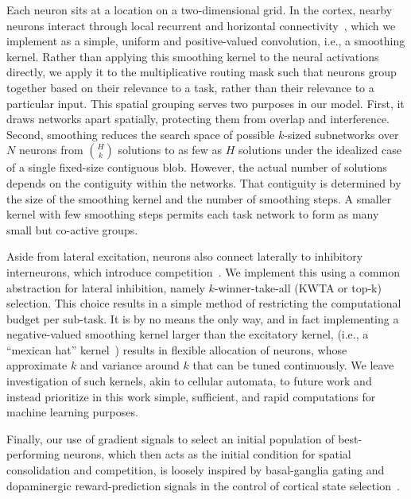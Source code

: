 \documentclass{article}
\begin{document}
Each neuron sits at a location on a two-dimensional grid. In the cortex, nearby neurons interact through local recurrent and horizontal connectivity~\citep{hubel1962receptive,gilbert1983clustered,douglas2004neuronal}, which we implement as a simple, uniform and positive-valued convolution, i.e., a smoothing kernel. Rather than applying this smoothing kernel to the neural activations directly, we apply it to the multiplicative routing mask such that neurons group together based on their relevance to a task, rather than their relevance to a particular input. This spatial grouping serves two purposes in our model. First, it draws networks apart spatially, protecting them from overlap and interference. Second, smoothing reduces the search space of possible $k$-sized subnetworks over $N$ neurons from $\binom{H}{k}$ solutions to as few as $H$ solutions under the idealized case of a single fixed-size contiguous blob. However, the actual number of solutions depends on the contiguity within the networks. That contiguity is determined by the size of the smoothing kernel and the number of smoothing steps. A smaller kernel with few smoothing steps permits each task network to form as many small but co-active groups.

Aside from lateral excitation, neurons also connect laterally to inhibitory interneurons, which introduce competition~\citep{maass2000computational,douglas2004neuronal,amari1977dynamics}. We implement this using a common abstraction for lateral inhibition, namely $k$-winner-take-all (KWTA or top-k) selection. This choice results in a simple method of restricting the computational budget per sub-task. It is by no means the only way, and in fact implementing a negative-valued smoothing kernel larger than the excitatory kernel, (i.e., a ``mexican hat'' kernel~\citep{wilson1972excitatory,amari1977dynamics}) results in flexible allocation of neurons, whose approximate $k$ and variance around $k$ that can be tuned continuously. We leave investigation of such kernels, akin to cellular automata, to future work and instead prioritize in this work simple, sufficient, and rapid computations for machine learning purposes.

Finally, our use of gradient signals to select an initial population of best-performing neurons, which then acts as the initial condition for spatial consolidation and competition, is loosely inspired by basal-ganglia gating and dopaminergic reward-prediction signals in the control of cortical state selection~\citep{mink1996basal,schultz1997neural,frank2001interactions,oreilly2006making,rolls2010attractor}.
\end{document}
